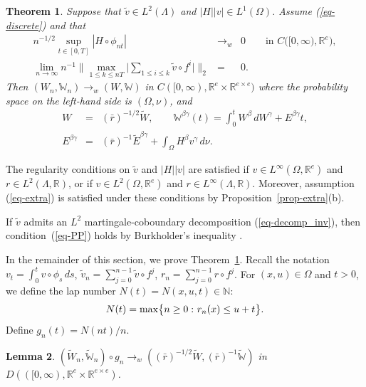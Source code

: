 \documentclass[aop,MSNbibl,seceqn,dvips]{arximspdf}
\newcommand{\eqref}[1]{(\ref{#1})}
\newtheorem{thmm}{Theorem}[section]
\newtheorem{lemma}[thmm]{Lemma}
\newcommand{\R}{\mathbb{R}}
\newcommand{\N}{\mathbb{N}}
\newcommand{\BBW}{\mathbb{W}}
\newcommand{\tildev}{\tilde{v}}
\newcommand{\tildeW}{\widetilde{W}}
\newcommand{\tildeBBW}{\widetilde{\mathbb W}}
\begin{document}
\begin{thmm} \label{thmm-WWflow}
Suppose that $\tildev\in L^2(\Lambda)$ and $|H||v|\in L^1(\Omega)$.
Assume \eqref{eq-discrete} and that
%
\begin{eqnarray}
\label{eq-extra}  n^{-1/2}\sup_{t\in[0,T]}|H\circ
\phi_{nt}|&\to_w&0\qquad \mbox{in $C\bigl([0,\infty),
\R^e\bigr)$},
\\
\label{eq-PP}  \lim_{n\to\infty}n^{-1} \biggl\|\max
_{1\le k\le nT} \biggl|\sum_{1\le
i\le k}\tildev\circ
f^i \biggr| \biggr\|_2&=&0.
\end{eqnarray}
%
Then $(W_n,\BBW_n)\to_w (W,\BBW)$ in $C([0,\infty),\R^e\times\R
^{e\times
e})$ where
the probability space on the left-hand side is $(\Omega,\nu)$, and
%
\begin{eqnarray*}
 W&=&(\bar r)^{-1/2}\tildeW,\qquad \BBW^{\beta\gamma}(t)=\int
_0^t W^\beta \,dW^\gamma+E^{\beta\gamma}t,
\\
 E^{\beta\gamma}&=&(\bar r)^{-1}\tilde E^{\beta\gamma} +\int
_{\Omega} H^\beta v^\gamma \,d\nu.
\end{eqnarray*}
%
\end{thmm}

\begin{rmk} \label{rmk-reg}
The regularity conditions on $\tildev$ and $|H||v|$ are satisfied if
$v\in L^\infty(\Omega,\R^e)$ and
$r\in L^2(\Lambda,\R)$, or if $v\in L^2(\Omega,\R^e)$ and $r\in
L^\infty
(\Lambda,\R)$.
Moreover, assumption \eqref{eq-extra} is satisfied under these conditions
by Proposition~\ref{prop-extra}(b).

If $\tildev$ admits an $L^2$ martingale-coboundary decomposition
\eqref
{eq-decomp_inv}, then condition~\eqref{eq-PP} holds by Burkholder's
inequality \cite{Burkholder73}.
\end{rmk}

In the remainder of this section, we prove Theorem~\ref{thmm-WWflow}.
Recall the notation $v_t=\int_0^t v\circ\phi_s \,ds$,
$\tildev_n=\sum_{j=0}^{n-1} \tildev\circ f^j$,
$r_n=\sum_{j=0}^{n-1} r\circ f^j$.
For $(x,u)\in\Omega$ and $t>0$, we define the lap number
$N(t)=N(x,u,t)\in\N$:
%
\[
N(t)=\max\bigl\{n\ge0\dvtx r_n(x)\le u+t\bigr\}.
\]
%
Define $g_n(t)=N(nt)/n$.

\begin{lemma} \label{lem-flow1}
$(\tildeW_n,\tildeBBW_n)\circ g_n\to_w
 ((\bar r)^{-1/2}\tildeW,(\bar r)^{-1}\tildeBBW )$
in $D(([0,\infty),\R^e\times\R^{e\times e})$.
\end{lemma}
\end{document}
